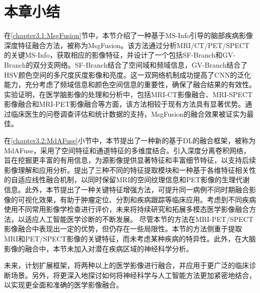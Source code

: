 \section{本章小结}
在\ref{chapter3.1:MsgFusion}节中，本节介绍了一种基于MS-Info引导的脑部疾病影像深度特征融合方法，被称为MsgFusion。该方法通过分析MRI/CT/PET/SPECT的关键MS-Info，获取相应的影像特征，并设计了一个包括SF-Branch和GV-Branch的双分支网络。SF-Branch结合了空间域和频域信息，GV-Branch结合了HSV颜色空间的多尺度灰度影像和亮度。这一双网络机制成功提高了CNN的泛化能力，充分考虑了频域信息和颜色空间信息的重要性，确保了融合结果的有效性。实验证明，在医学脑影像的处理和分析中，包括MRI-CT影像融合、MRI-SPECT影像融合和MRI-PET影像融合等方面，该方法相较于现有方法具有显著优势。通过临床医生的问卷调查评估和统计数据的支持，MsgFusion的融合效果被证实为最佳。

在\ref{chapter3.2:MdAFuse}小节中，本节提出了一种新的基于DL的融合框架，被称为MdAFuse，采用了空间特征和通道特征的多维度结合。引入深度分离卷积网络，旨在挖掘更丰富的有用信息，为源影像提供显著特征和丰富细节特征，以支持后续影像理解和应用分析。提出了三种不同的特征提取模块和一种基于各维特征相关性的自适应线性融合机制，以同时保留MRI的空间纹理信息和PET影像的生理代谢信息。此外，本节提出了一种关键特征增强方法，可提升同一病例不同时期融合影像的可视化效果，有助于肿瘤定位、分割和疾病跟踪等临床应用。考虑到不同疾病使用不同常用影像学检查进行评价，未来将持续研究和拓展多模态医学影像融合方法，以适应人工智能医学诊断的不断发展。
尽管本节的方法在MRI-PET/SPECT影像融合中表现出一定的优势，但仍存在一些局限性。本节的方法侧重于提取MRI和PET/SPECT影像的关键特征，而未考虑某种疾病的特异性。此外，在大脑影像的融合中，本节未加入对潜在疾病区域的神经科学分析。

未来，计划扩展框架，将两种以上的医学影像进行融合，并应用于更广泛的临床诊断场景。另外，将更深入地探讨如何将神经科学与人工智能方法更加紧密地结合，以实现更全面和准确的医学影像融合。